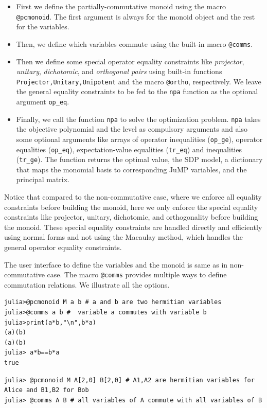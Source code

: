 \begin{itemize}
    \item First we define the partially-commutative monoid using the macro \texttt{@pcmonoid}. The first argument is always for the monoid object and the rest for the variables. 
    \item Then, we define which variables commute using the built-in macro \texttt{@comms}. 
    \item Then we define some special operator equality constraints like \emph{projector}, \emph{unitary}, \emph{dichotomic}, and \emph{orthogonal pairs} using built-in functions \texttt{Projector,Unitary,Unipotent} and the macro \texttt{@ortho}, respectively. We leave the general equality constraints to be fed to the \texttt{npa} function as the optional argument \texttt{op\_eq}.
    \item Finally, we call the function \texttt{npa} to solve the optimization problem. \texttt{npa} takes the objective polynomial and the level as compulsory arguments and also some optional arguments like arrays of operator inequalities (\texttt{op\_ge}), operator equalities (\texttt{op\_eq}), expectation-value equalities (\texttt{tr\_eq}) and inequalities (\texttt{tr\_ge}). The function returns the optimal value, the SDP model, a dictionary that maps the monomial basis to corresponding JuMP variables, and the principal matrix.
\end{itemize}
\begin{remark}
Notice that compared to the non-commutative case, where we enforce all equality constraints before building the monoid, here we only enforce the special equality constraints like projector, unitary, dichotomic, and orthogonality before building the monoid. These special equality constraints are handled directly and efficiently using normal forms and not using the Macaulay method, which handles the general operator equality constraints. 
\end{remark}
The user interface to define the variables and the monoid is same as in non-commutative case. The macro \texttt{@comms} provides multiple ways to define commutation relations. We illustrate all the options.
\begin{lstlisting}[style=code, mathescape=true]
julia>@pcmonoid M a b # a and b are two hermitian variables
julia>@comms a b #  variable a commutes with variable b
julia>print(a*b,"\n",b*a)
(a)(b)
(a)(b)
julia> a*b==b*a
true
\end{lstlisting}
\begin{lstlisting}[style=code, mathescape=true]
julia> @pcmonoid M A[2,0] B[2,0] # A1,A2 are hermitian variables for Alice and B1,B2 for Bob
julia> @comms A B # all variables of A commute with all variables of B
\end{lstlisting}
